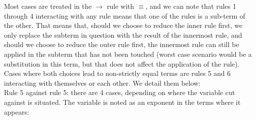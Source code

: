 \begin{myproof}
Most cases are treated in the $\to$ rule with $\equiv$, and we can note that rules 1 through 4 interacting with any rule means that one of the rules is a sub-term of the other. That means that, should we choose to reduce the inner rule first, we only replace the subterm in question with the result of the innermost rule, and should we choose to reduce the outer rule first, the innermost rule can still be applied in the subterm that has not been touched (worst case scenario would be a substitution in this term, but that does not affect the application of the rule). Cases where both choices lead to non-strictly equal terms are rules 5 and 6 interacting with themselves or each other. We detail them below:\\
Rule 5 against rule 5: there are 4 cases, depending on where the variable cut against is situated. The variable is noted as an exponent in the terms where it appears:\\
\\
\\
\\
\end{myproof}
